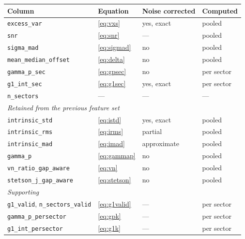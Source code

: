 \documentclass[11pt]{article}
\begin{document}
\begin{table}[htbp]
\centering
\small
\begin{tabular}{llll}
\toprule
Column & Equation & Noise corrected & Computed \\
\midrule
\texttt{excess\_var}         & \eqref{eq:vxs}      & yes, exact & pooled \\
\texttt{snr}                 & \eqref{eq:snr}      & ---        & pooled \\
\texttt{sigma\_mad}          & \eqref{eq:sigmad}   & no         & pooled \\
\texttt{mean\_median\_offset}& \eqref{eq:delta}    & no         & pooled \\
\texttt{gamma\_p\_sec}       & \eqref{eq:gpsec}    & no         & per sector \\
\texttt{g1\_int\_sec}        & \eqref{eq:g1sec}    & yes, exact & per sector \\
\texttt{n\_sectors}          & ---                 & ---        & --- \\
\midrule
\multicolumn{4}{l}{\emph{Retained from the previous feature set}}\\
\texttt{intrinsic\_std}      & \eqref{eq:istd}     & yes, exact & pooled \\
\texttt{intrinsic\_rms}      & \eqref{eq:irms}     & partial    & pooled \\
\texttt{intrinsic\_mad}      & \eqref{eq:imad}     & approximate& pooled \\
\texttt{gamma\_p}            & \eqref{eq:gammap}   & no         & pooled \\
\texttt{vn\_ratio\_gap\_aware}  & \eqref{eq:vn}      & no      & pooled \\
\texttt{stetson\_j\_gap\_aware} & \eqref{eq:stetson} & no      & pooled \\
\midrule
\multicolumn{4}{l}{\emph{Supporting}}\\
\texttt{g1\_valid}, \texttt{n\_sectors\_valid} & \eqref{eq:g1valid} & --- & per sector \\
\texttt{gamma\_p\_persector} & \eqref{eq:gpk}      & ---        & per sector \\
\texttt{g1\_int\_persector}  & \eqref{eq:g1k}      & ---        & per sector \\
\bottomrule
\end{tabular}
\end{table}
\end{document}
